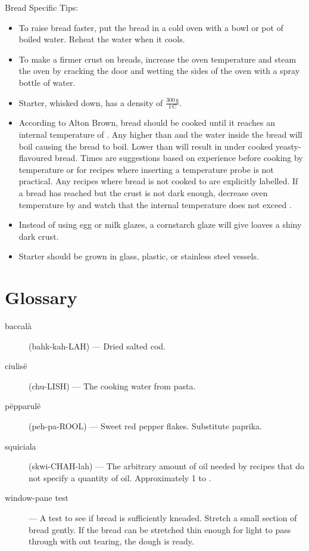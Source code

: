 \documentclass{book}
\begin{document}
\noindent Bread Specific Tips:
\begin{itemize}
\item To raise bread faster, put the bread in a cold oven with a bowl or pot of boiled water. Reheat the water when it cools.
\item To make a firmer crust on breads, increase the oven temperature and steam the oven by cracking the door and wetting the sides of the oven with a spray bottle of water.
\item Starter, whisked down, has a density of $\frac{300\,\mathrm{g}}{1\,\mathrm{C}}$.
\item According to Alton Brown, bread should be cooked until it reaches an internal temperature of . Any higher than  and the water inside the bread will boil causing the bread to boil. Lower than  will result in under cooked yeasty-flavoured bread. Times are suggestions based on experience before cooking by temperature or for recipes where inserting a temperature probe is not practical. Any recipes where bread is not cooked to  are explicitly labelled. If a bread has reached  but the crust is not dark enough, decrease oven temperature by  and watch that the internal temperature does not exceed .
\item Instead of using egg or milk glazes, a cornstarch glaze will give loaves a shiny dark crust.
\item Starter should be grown in glass, plastic, or stainless steel vessels.
\end{itemize}

\def\ThisFile{rcp:ToastingNuts}

\mainmatter



\backmatter

\chapter{Glossary}
\begin{description}
\item[baccal\`a] (bahk-kah-LAH) --- Dried salted cod.
\item[ciulis\"e] (chu-LISH) --- The cooking water from pasta.
\item[p\"epparul\"e] (peh-pa-ROOL) --- Sweet red pepper flakes. Substitute paprika.
\item[squiciala] (skwi-CHAH-lah) --- The arbitrary amount of oil needed by recipes that do not specify a quantity of oil. Approximately 1 to .
\item[window-pane test] --- A test to see if bread is sufficiently kneaded. Stretch a small section of bread gently. If the bread can be stretched thin enough for light to pass through with out tearing, the dough is ready.
\end{description}

\printindex
\end{document}
